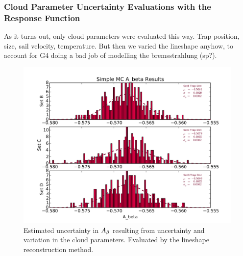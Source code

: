 	
\subsubsection{Cloud Parameter Uncertainty Evaluations with the Response Function}
As it turns out, only cloud parameters were evaluated this way. 
Trap position, size, sail velocity, temperature.  But then we varied the lineshape anyhow, to account for G4 doing a bad job of modelling the bremsstrahlung (sp?).
	
\begin{figure}[h!!]
	\centering
	\includegraphics[width=.999\linewidth]
	{Figures/Position_Err_Abeta.png}
	\caption[$\Abeta$ Position Error]{Estimated uncertainty in $\Abeta$ resulting from uncertainty and variation in the cloud parameters.  Evaluated by the lineshape reconstruction method.}	
	\label{fig:Abeta_position_err}
\end{figure}

